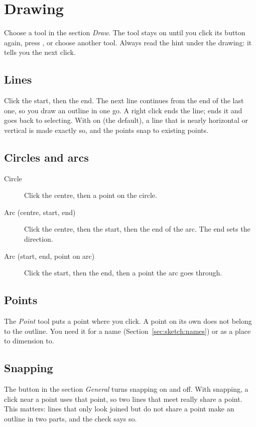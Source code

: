 \section{Drawing}\label{sec:sketch:draw}

Choose a tool in the section \emph{Draw}. The tool stays on until you click its button again, press , or choose another tool. Always read the hint under the drawing: it tells you the next click.

\subsection{Lines}
Click the start, then the end. The next line continues from the end of the last one, so you draw an outline in one go. A right click ends the line;  ends it and goes back to selecting. With  on (the default), a line that is nearly horizontal or vertical is made exactly so, and the points snap to existing points.

\subsection{Circles and arcs}
\begin{description}
\item[Circle] Click the centre, then a point on the circle.
\item[Arc (centre, start, end)] Click the centre, then the start, then the end of the arc. The end sets the direction.
\item[Arc (start, end, point on arc)] Click the start, then the end, then a point the arc goes through.
\end{description}

\subsection{Points}
The \emph{Point} tool puts a point where you click. A point on its own does not belong to the outline. You need it for a name (Section~\ref{sec:sketch:names}) or as a place to dimension to.

\subsection{Snapping}
The button  in the section \emph{General} turns snapping on and off. With snapping, a click near a point uses that point, so two lines that meet really share a point. This matters: lines that only look joined but do not share a point make an outline in two parts, and the check says so.

